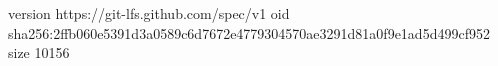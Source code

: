 version https://git-lfs.github.com/spec/v1
oid sha256:2ffb060e5391d3a0589c6d7672e4779304570ae3291d81a0f9e1ad5d499cf952
size 10156
